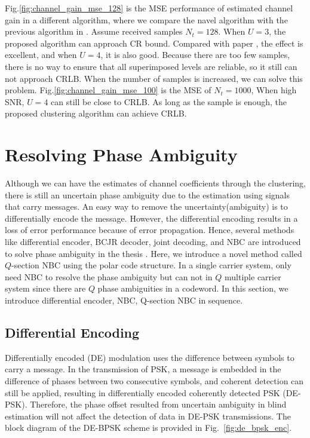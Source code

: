 Fig.\ref{fig:channel_gain_mse_128} is the MSE performance of estimated channel gain in a different algorithm, where we compare the navel algorithm with the previous algorithm in \cite{hsu2020uplink}. Assume received samples $N_t=128$. When $U=3$, the proposed algorithm can approach CR bound. Compared with paper \cite{hsu2020uplink}, the effect is excellent, and when $U=4$, it is also good. Because there are too few samples, there is no way to ensure that all superimposed levels are reliable, so it still can not approach CRLB. When the number of samples is increased, we can solve this problem. Fig.\ref{fig:channel_gain_mse_100} is the MSE of $N_t=1000$, When high SNR, $U=4$ can still be close to CRLB. As long as the sample is enough, the proposed clustering algorithm can achieve CRLB.


\section{Resolving Phase Ambiguity}
\label{s:ambiguity}

Although we can have the estimates of channel coefficients through the clustering, there is still an uncertain phase ambiguity due to the estimation using signals that carry messages. An easy way to remove the uncertainty(ambiguity) is to differentially encode the message. However, the differential encoding results in a loss of error performance because of error propagation. Hence, several methods like differential encoder, BCJR decoder, joint decoding, and NBC are introduced to solve phase ambiguity in the thesis \cite{yt19}. Here, we introduce a novel method called $ Q $-section NBC using the polar code structure. In a single carrier system, only need NBC to resolve the phase ambiguity but can not in $Q$ multiple carrier system since there are $Q$ phase ambiguities in a codeword. In this section, we introduce differential encoder, NBC, Q-section NBC in sequence.

\subsection{Differential Encoding}

Differentially encoded (DE) modulation uses the difference between symbols to carry a message. In the transmission of PSK, a message is embedded in the difference of phases between two consecutive symbols, and coherent detection can still be applied, resulting in differentially encoded coherently detected PSK (DE-PSK). Therefore, the phase offset resulted from uncertain ambiguity in blind estimation will not affect the detection of data in DE-PSK transmissions. The block diagram of the DE-BPSK scheme is provided in Fig.~\ref{fig:de_bpsk_enc}.

